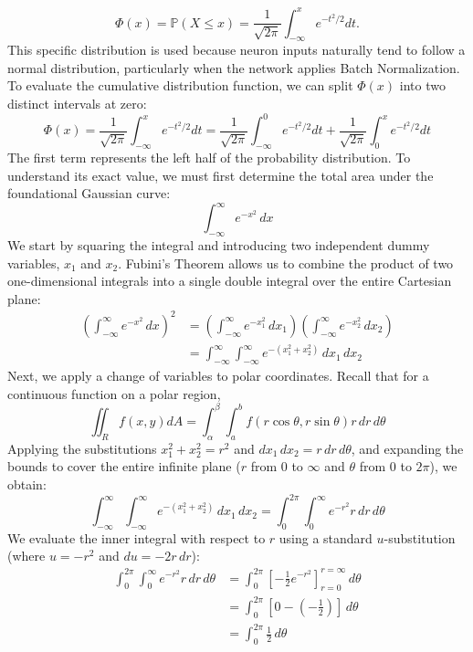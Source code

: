 \documentclass[11pt]{article}
\begin{document}
$$
\Phi(x) = \mathbb{P}(X \leq x) = \frac{1}{\sqrt{2\pi}} \int_{-\infty}^{x} e^{-t^2/2} dt.
$$
This specific distribution is used because neuron inputs naturally tend to follow a normal distribution, particularly when the network applies Batch Normalization. To evaluate the cumulative distribution function, we can split $\Phi(x)$ into two distinct intervals at zero:
\begin{equation*}
\Phi(x) = \frac{1}{\sqrt{2\pi}} \int_{-\infty}^{x} e^{-t^2/2} dt =  \frac{1}{\sqrt{2\pi}} \int_{-\infty}^{0} e^{-t^2/2} dt + \frac{1}{\sqrt{2\pi}} \int_{0}^{x} e^{-t^2/2} dt
\end{equation*}
The first term represents the left half of the probability distribution. To understand its exact value, we must first determine the total area under the foundational Gaussian curve:
\begin{equation*}
\int_{-\infty}^{\infty} e^{-x^2} \, dx
\end{equation*}
We start by squaring the integral and introducing two independent dummy variables, $x_1$ and $x_2$. Fubini's Theorem allows us to combine the product of two one-dimensional integrals into a single double integral over the entire Cartesian plane:
\begin{align*}
\left( \int_{-\infty}^{\infty} e^{-x^2} \, dx \right)^2 &= \left( \int_{-\infty}^{\infty} e^{-x_1^2} \, dx_1 \right) \left( \int_{-\infty}^{\infty} e^{-x_2^2} \, dx_2 \right) \\
&= \int_{-\infty}^{\infty} \int_{-\infty}^{\infty} e^{-(x_1^2 + x_2^2)} \, dx_1 \, dx_2
\end{align*}
Next, we apply a change of variables to polar coordinates. Recall that for a continuous function on a polar region, 
\begin{equation*}
\iint_R f(x,y) dA = \int_{\alpha}^{\beta} \int_a^b f(r\cos\theta, r\sin\theta) r \, dr \, d\theta
\end{equation*}
Applying the substitutions $x_1^2 + x_2^2 = r^2$ and $dx_1 \, dx_2 = r \, dr \, d\theta$, and expanding the bounds to cover the entire infinite plane ($r$ from $0$ to $\infty$ and $\theta$ from $0$ to $2\pi$), we obtain:
\begin{equation*}
\int_{-\infty}^{\infty} \int_{-\infty}^{\infty} e^{-(x_1^2 + x_2^2)} \, dx_1 \, dx_2 = \int_0^{2\pi} \int_0^{\infty} e^{-r^2} r \, dr \, d\theta
\end{equation*}
We evaluate the inner integral with respect to $r$ using a standard $u$-substitution (where $u = -r^2$ and $du = -2r \, dr$):
\begin{align*}
\int_0^{2\pi} \int_0^{\infty} e^{-r^2} r \, dr \, d\theta &= \int_0^{2\pi} \left[ -\frac{1}{2} e^{-r^2} \right]_{r=0}^{r=\infty} \, d\theta \\
&= \int_0^{2\pi} \left[ 0 - \left(-\frac{1}{2}\right) \right] \, d\theta \\
&= \int_0^{2\pi} \frac{1}{2} \, d\theta
\end{align*}
\end{document}
